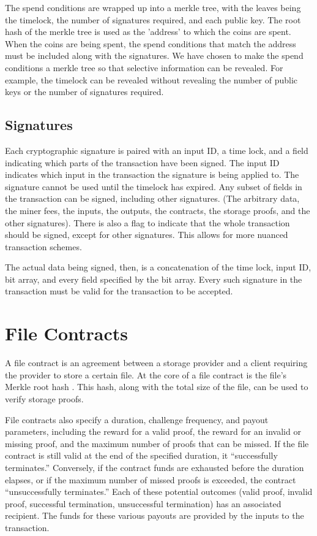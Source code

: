 \documentclass[twocolumn]{article}
\begin{document}
The spend conditions are wrapped up into a merkle tree, with the leaves being the timelock, the number of signatures required, and each public key.
The root hash of the merkle tree is used as the 'address' to which the coins are spent.
When the coins are being spent, the spend conditions that match the address must be included along with the signatures.
We have chosen to make the spend conditions a merkle tree so that selective information can be revealed.
For example, the timelock can be revealed without revealing the number of public keys or the number of signatures required.

\subsection{Signatures}
Each cryptographic signature is paired with an input ID, a time lock, and a field indicating which parts of the transaction have been signed.
The input ID indicates which input in the transaction the signature is being applied to.
The signature cannot be used until the timelock has expired.
Any subset of fields in the transaction can be signed, including other signatures. (The arbitrary data, the miner fees, the inputs, the outputs, the contracts, the storage proofs, and the other signatures).
There is also a flag to indicate that the whole transaction should be signed, except for other signatures.
This allows for more nuanced transaction schemes.

The actual data being signed, then, is a concatenation of the time lock, input ID, bit array, and every field specified by the bit array.
Every such signature in the transaction must be valid for the transaction to be accepted.

\section{File Contracts}
\label{sec:contracts}
A file contract is an agreement between a storage provider and a client requiring the provider to store a certain file.
At the core of a file contract is the file's Merkle root hash \cite{merkle}.
This hash, along with the total size of the file, can be used to verify storage proofs.

File contracts also specify a duration, challenge frequency, and payout parameters, including the reward for a valid proof, the reward for an invalid or missing proof, and the maximum number of proofs that can be missed.
If the file contract is still valid at the end of the specified duration, it ``successfully terminates.''
Conversely, if the contract funds are exhausted before the duration elapses, or if the maximum number of missed proofs is exceeded, the contract ``unsuccessfully terminates.''
Each of these potential outcomes (valid proof, invalid proof, successful termination, unsuccessful termination) has an associated recipient.
The funds for these various payouts are provided by the inputs to the transaction.
\end{document}
